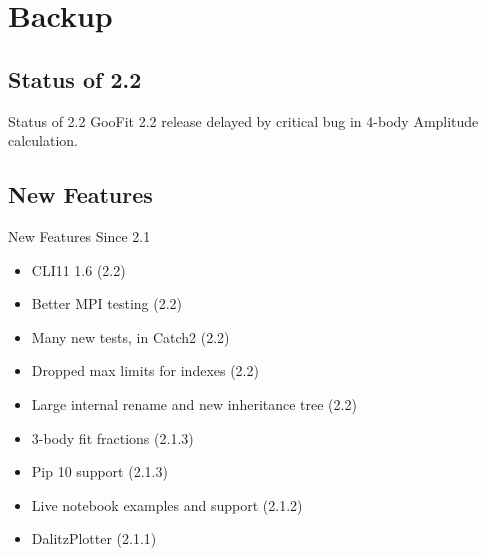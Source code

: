 \documentclass[aspectratio=169, smaller]{beamer}
\begin{document}
\section{Backup}

\subsection{Status of 2.2}
\begin{frame}{Status of 2.2}
    GooFit 2.2 release delayed by critical bug in 4-body Amplitude calculation.    
\end{frame}

\subsection{New Features}
\begin{frame}{New Features Since 2.1}
    \begin{itemize}
        \item CLI11 1.6 (2.2)
        \item Better MPI testing (2.2)
        \item Many new tests, in Catch2 (2.2)
        \item Dropped max limits for indexes (2.2)
        \item Large internal rename and new inheritance tree (2.2)
        \item 3-body fit fractions (2.1.3)
        \item Pip 10 support (2.1.3)
        \item Live notebook examples and support (2.1.2)
        \item DalitzPlotter (2.1.1)
    \end{itemize}
\end{frame}

\backupend
\end{document}
